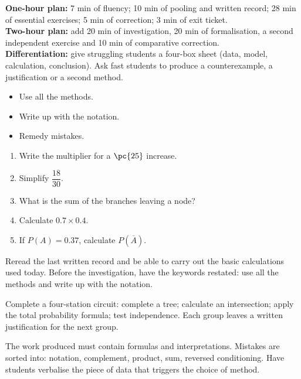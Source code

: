     \ifmxteacher
    \begin{method}
    \textbf{One-hour plan:} 7 min of fluency; 10 min of pooling and written record; 28 min of essential exercises; 5 min of correction; 3 min of exit ticket.\\
\textbf{Two-hour plan:} add 20 min of investigation, 20 min of formalisation, a second independent exercise and 10 min of comparative correction.\\
\textbf{Differentiation:} give struggling students a four-box sheet (data, model, calculation, conclusion). Ask fast students to produce a counterexample, a justification or a second method.
    \end{method}
    \fi
{}
\begin{objectives}\begin{itemize}\item Use all the methods.\item Write up with the notation.\item Remedy mistakes.\end{itemize}\end{objectives}
\begin{fluency}\begin{enumerate}\item Write the multiplier for a $\pc{25}$ increase. \item Simplify $\dfrac{18}{30}$. \item What is the sum of the branches leaving a node? \item Calculate $\num{0,7}\times\num{0,4}$. \item If $P(A)=\num{0,37}$, calculate $P(\overline A)$. \end{enumerate}\end{fluency}
\begin{prerequisites}Reread the last written record and be able to carry out the basic calculations used today. Before the investigation, have the keywords restated: use all the methods and write up with the notation.\end{prerequisites}

\begin{activity}
Complete a four-station circuit: complete a tree; calculate an intersection; apply the total probability formula; test independence. Each group leaves a written justification for the next group.

\end{activity}
\begin{solution}The work produced must contain formulas and interpretations. Mistakes are sorted into: notation, complement, product, sum, reversed conditioning. Have students verbalise the piece of data that triggers the choice of method.\end{solution}

